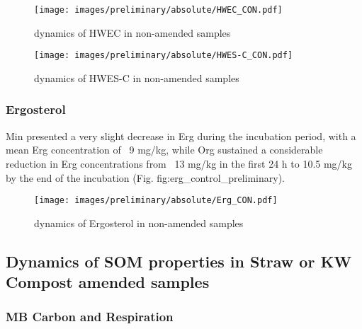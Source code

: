             \begin{figure}[H]
                \centering
                \texttt{[image: images/preliminary/absolute/HWEC\_CON.pdf]}
                \caption{dynamics of HWEC in non-amended samples}
                \label{fig:hwec_control_preliminary}
            \end{figure}
            
            \begin{figure}[H]
                \centering
                \texttt{[image: images/preliminary/absolute/HWES-C\_CON.pdf]}
                \caption{dynamics of HWES-C in non-amended samples}
                \label{fig:hwes-c_control_preliminary}
            \end{figure}
       
        \subsubsection{Ergosterol}
            
            Min presented a  very slight decrease in Erg during the incubation period, with a mean Erg concentration of ~9 mg/kg, while Org sustained a considerable reduction in Erg concentrations from ~13 mg/kg in the first 24 h to \midtilde{}10.5 mg/kg by the end of the incubation (Fig. fig:erg_control_preliminary).
            
            \begin{figure}[H]
                \centering
                \texttt{[image: images/preliminary/absolute/Erg\_CON.pdf]}
                \caption{dynamics of Ergosterol in non-amended samples}
                \label{fig:erg_control_preliminary}
            \end{figure}

    
    \subsection{Dynamics of SOM properties in Straw or KW Compost amended samples}
        
        \subsubsection{MB Carbon and Respiration}
            
